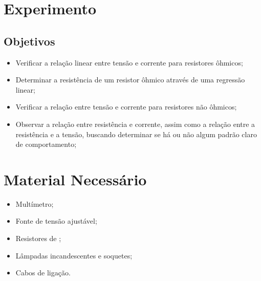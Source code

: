 
\section{Experimento}

\subsection{Objetivos}
\label{Sec:ObjetivosLeiDeOhm}

\begin{itemize}
	\item Verificar a relação linear entre tensão e corrente para resistores ôhmicos;
	\item Determinar a resistência de um resistor ôhmico através de uma regressão linear;
	\item Verificar a relação entre tensão e corrente para resistores não ôhmicos;
	\item Observar a relação entre resistência e corrente, assim como a relação entre a resistência e a tensão, buscando determinar se há ou não algum padrão claro de comportamento;
\end{itemize}

\section{Material Necessário}

\begin{itemize}
	\item Multímetro;
	\item Fonte de tensão ajustável;
	\item Resistores de ;
	\item Lâmpadas incandescentes e soquetes; 
	\item Cabos de ligação.
\end{itemize}

